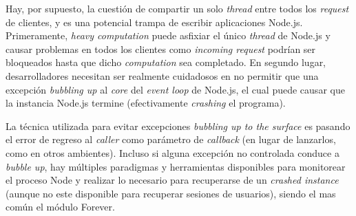 Hay, por supuesto, la cuestión de compartir un solo \textit{thread} entre todos los \textit{request} de clientes, y es una potencial trampa de escribir aplicaciones Node.js. Primeramente, \textit{heavy computation} puede asfixiar el único \textit{thread} de Node.js y causar problemas en todos los clientes como \textit{incoming request} podrían ser bloqueados hasta que dicho \textit{computation} sea completado. En segundo lugar, desarrolladores necesitan ser realmente cuidadosos en no permitir que una excepción \textit{bubbling up} al \textit{core} del \textit{event loop} de Node.js, el cual puede causar que la instancia Node.js termine (efectivamente \textit{crashing} el programa).

La técnica utilizada para evitar excepciones \textit{bubbling up to the surface} es pasando el error de regreso al \textit{caller} como parámetro de \textit{callback} (en lugar de lanzarlos, como en otros ambientes). Incluso si alguna excepción no controlada conduce a \textit{bubble up}, hay múltiples paradigmas y herramientas disponibles para monitorear el proceso Node y realizar lo necesario para recuperarse de un \textit{crashed instance} (aunque no este disponible para recuperar sesiones de usuarios), siendo el mas común el módulo Forever\cite{online_github_nodejitsu_forever}.



